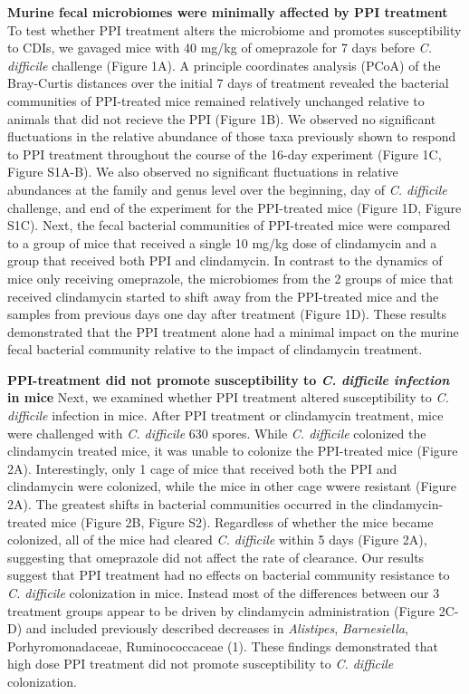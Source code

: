 \documentclass[11pt,]{article}
\begin{document}
\textbf{Murine fecal microbiomes were minimally affected by PPI
treatment } To test whether PPI treatment alters the microbiome and
promotes susceptibility to CDIs, we gavaged mice with 40 mg/kg of
omeprazole for 7 days before \emph{C. difficile} challenge (Figure 1A).
A principle coordinates analysis (PCoA) of the Bray-Curtis distances
over the initial 7 days of treatment revealed the bacterial communities
of PPI-treated mice remained relatively unchanged relative to animals
that did not recieve the PPI (Figure 1B). We observed no significant
fluctuations in the relative abundance of those taxa previously shown to
respond to PPI treatment throughout the course of the 16-day experiment
(Figure 1C, Figure S1A-B). We also observed no significant fluctuations
in relative abundances at the family and genus level over the beginning,
day of \emph{C. difficile} challenge, and end of the experiment for the
PPI-treated mice (Figure 1D, Figure S1C). Next, the fecal bacterial
communities of PPI-treated mice were compared to a group of mice that
received a single 10 mg/kg dose of clindamycin and a group that received
both PPI and clindamycin. In contrast to the dynamics of mice only
receiving omeprazole, the microbiomes from the 2 groups of mice that
received clindamycin started to shift away from the PPI-treated mice and
the samples from previous days one day after treatment (Figure 1D).
These results demonstrated that the PPI treatment alone had a minimal
impact on the murine fecal bacterial community relative to the impact of
clindamycin treatment.

\textbf{PPI-treatment did not promote susceptibility to \emph{C.
difficile infection} in mice} Next, we examined whether PPI treatment
altered susceptibility to \emph{C. difficile} infection in mice. After
PPI treatment or clindamycin treatment, mice were challenged with
\emph{C. difficile} 630 spores. While \emph{C. difficile} colonized the
clindamycin treated mice, it was unable to colonize the PPI-treated mice
(Figure 2A). Interestingly, only 1 cage of mice that received both the
PPI and clindamycin were colonized, while the mice in other cage wwere
resistant (Figure 2A). The greatest shifts in bacterial communities
occurred in the clindamycin-treated mice (Figure 2B, Figure S2).
Regardless of whether the mice became colonized, all of the mice had
cleared \emph{C. difficile} within 5 days (Figure 2A), suggesting that
omeprazole did not affect the rate of clearance. Our results suggest
that PPI treatment had no effects on bacterial community resistance to
\emph{C. difficile} colonization in mice. Instead most of the
differences between our 3 treatment groups appear to be driven by
clindamycin administration (Figure 2C-D) and included previously
described decreases in \emph{Alistipes}, \emph{Barnesiella},
Porhyromonadaceae, Ruminococcaceae (1). These findings demonstrated that
high dose PPI treatment did not promote susceptibility to \emph{C.
difficile} colonization.
\end{document}
